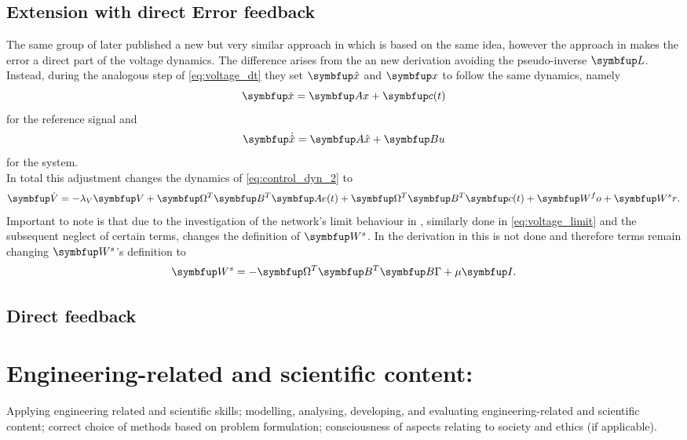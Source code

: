 \subsection{Extension with direct Error feedback}
The same group of \cite{huang_optimizing_2017} later published a new but very similar approach in \cite{huang_spiking_2019} which is based on the same idea, however the approach in \cite{huang_spiking_2019} makes the error a direct part of the voltage dynamics. The difference arises from the an new derivation avoiding the pseudo-inverse $\bmu{L}$.\\
Instead, during the analogous step of \cref{eq:voltage_dt} they set $\bmu{\hat{x}}$
and $\bmu{x}$ to follow the same dynamics, namely
\begin{equation}
	\bmu{\dot{x}} = \bmu{Ax} + \bmu{c}(t)
\end{equation}
for the reference signal and
\begin{equation}
	\bmu{\dot{\hat{x}}} = \bmu{A\hat{x}} + \bmu{Bu}
\end{equation}
for the system.\\
In total this adjustment changes the dynamics of \cref{eq:control_dyn_2} to
\begin{equation}
	\bmu{\dot{V}} = -\lambda_V\bmu{V} + \bmu{\Omega}^T \bmu{B}^T\bmu{Ae}(t) + \bmu{\Omega}^T \bmu{B}^T \bmu{c}(t) + \bmu{W^fo} + \bmu{W^sr}.
\end{equation}
Important to note is that due to the investigation of the network's limit behaviour in \cite{huang_optimizing_2017}, similarly done in \cref{eq:voltage_limit} and the subsequent neglect of certain terms, changes the definition of $\bmu{W^s}$. In the derivation in \cite{huang_spiking_2019} this is not done and therefore terms remain changing $\bmu{W^s}$'s definition to
\begin{equation}
	\bmu{W^s} = -\bmu{\Omega}^T\bmu{B}^T\bmu{B\Gamma} + \mu\bmu{I}.
\end{equation}

\subsection{Direct feedback}


\section{Engineering-related and scientific content:}
Applying engineering related and scientific skills; modelling, analysing, developing, and evaluating engineering-related and scientific content; correct choice of methods based on problem formulation; consciousness of aspects relating to society and ethics (if applicable).

